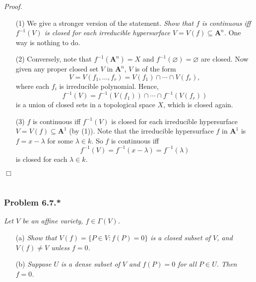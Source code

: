 \documentclass{article}
\begin{document}
\emph{Proof.}
\begin{enumerate}
\item[(1)]
  We give a stronger version of the statement.
  \emph{Show that $f$ is continuous iff
  $f^{-1}(V)$ is closed for each irreducible hypersurface $V = V(f) \subseteq \mathbf{A}^{n}$.}
  One way is nothing to do.

\item[(2)]
  Conversely,
  note that $f^{-1}(\mathbf{A}^{n}) = X$ and $f^{-1}(\varnothing) = \varnothing$ are closed.
  Now given any proper closed set $V$ in $\mathbf{A}^{n}$,
  $V$ is of the form
  \[
    V = V(f_1, \ldots, f_r) = V(f_1) \cap \cdots \cap V(f_r),
  \]
  where each $f_i$ is irreducible polynomial.
  Hence,
  \[
    f^{-1}(V) = f^{-1}(V(f_1)) \cap \cdots \cap f^{-1}(V(f_r))
  \]
  is a union of closed sets in a topological space $X$, which is closed again.

\item[(3)]
  $f$ is continuous iff
  $f^{-1}(V)$ is closed for each irreducible hypersurface $V = V(f) \subseteq \mathbf{A}^{1}$
  (by (1)).
  Note that the irreducible hypersurface $f$ in $\mathbf{A}^{1}$ is
  $f = x - \lambda$ for some $\lambda \in k$.
  So $f$ is continuous iff
  \[
    f^{-1}(V) = f^{-1}(x - \lambda) = f^{-1}(\lambda)
  \]
  is closed for each $\lambda \in k$.
\end{enumerate}
$\Box$ \\\\






\subsubsection*{Problem 6.7.*}
\emph{Let $V$ be an affine variety, $f \in \Gamma(V)$.}
\begin{enumerate}
\item[(a)]
  \emph{Show that $V(f) = \{ P \in V : f(P) = 0 \}$ is a closed subset of $V$,
  and $V(f) \neq V$ unless $f = 0$.}

\item[(b)]
  \emph{Suppose $U$ is a dense subset of $V$ and $f(P) = 0$ for all $P \in U$.
  Then $f = 0$.} \\
\end{enumerate}
\end{document}
